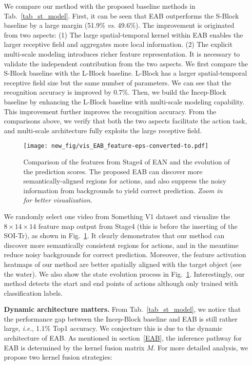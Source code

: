 We compare our method with the proposed baseline methods in Tab.~\ref{tab_st_model}. First, it can be seen that EAB outperforms the S-Block baseline by a large margin (51.9\% \textit{vs.} 49.6\%). The improvement is originated from two aspects: (1) The large spatial-temporal kernel within EAB enables the larger receptive field and aggregates more local information. (2) The explicit multi-scale modeling introduces richer feature representation.
It is necessary to validate the independent contribution from the two aspects. We first compare the S-Block baseline with the L-Block baseline. L-Block has a larger spatial-temporal receptive field size but the same number of parameters. We can see that the recognition accuracy is improved by 0.7\%.
Then, we build the Incep-Block baseline by enhancing the L-Block baseline with multi-scale modeling capability. This improvement further improves the recognition accuracy. From the comparisons above, we verify that both the two aspects facilitate the action task, and multi-scale architecture fully exploits the large receptive field.

\begin{figure}[!thbp]
	\centering
	\centerline{\texttt{[image: new\_fig/vis\_EAB\_feature-eps-converted-to.pdf]}}
	\caption {Comparison of the features from Stage4 of EAN and the evolution of the prediction scores. The proposed EAB can discover more semantically-aligned regions for actions, and also suppress the noisy information from backgrounds to yield correct prediction. \textit{Zoom in for better visualization.}
	}
\label{fig_vis_feature}
\end{figure}

We randomly select one video from Something V1 dataset and visualize the $8\times14\times14$ feature map output from Stage4 (this is before the inserting of the SOI-Tr), as shown in Fig.~\ref{fig_vis_feature}. It clearly demonstrates that our method can discover more semantically consistent regions for actions, and in the meantime reduce noisy backgrounds for correct prediction. Moreover, the feature activation heatmaps of our method are better spatially aligned with the target object (see the water).
We also show the state evolution process in Fig.~\ref{fig_vis_feature}. Interestingly, our method detects the start and end points of actions although only trained with classification labels.





\textbf{Dynamic architecture matters.}
From Tab.~\ref{tab_st_model}, we notice that the performance gap between the Incep-Block baseline and EAB is still rather large, \textit{i.e.}, 1.1\% Top1 accuracy. We conjecture this is due to the dynamic architecture of EAB. As mentioned in section~\ref{EAB}, the inference pathway for EAB is determined by the kernel fusion matrix $M$. For more detailed analysis, we propose two kernel fusion strategies:


